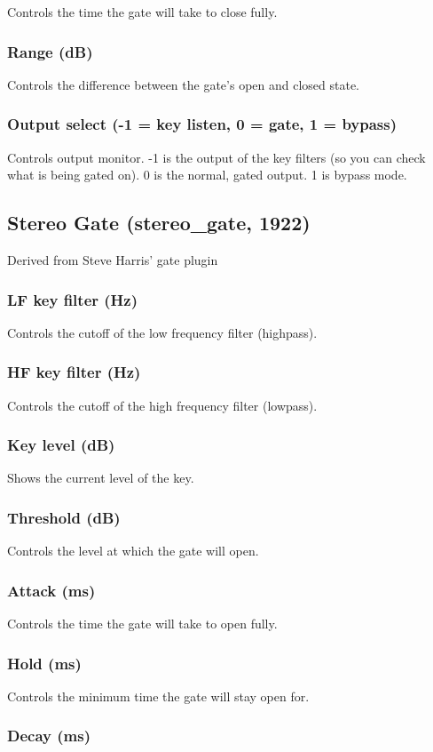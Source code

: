\documentclass[11pt]{article}
\begin{document}
Controls the time the gate will take to close fully.\subsubsection*{Range (dB)}
Controls the difference between the gate's open and closed state.\subsubsection*{Output select (-1 = key listen, 0 = gate, 1 = bypass)}
Controls output monitor. -1 is the output of the key filters (so you can check what is being gated on). 0 is the normal, gated output. 1 is bypass mode.\subsection{Stereo Gate (stereo\_gate, 1922)\label{stereo_gate}\label{id1922}}
Derived from Steve Harris' gate plugin\subsubsection*{LF key filter (Hz)}
Controls the cutoff of the low frequency filter (highpass).\subsubsection*{HF key filter (Hz)}
Controls the cutoff of the high frequency filter (lowpass).\subsubsection*{Key level (dB)}
Shows the current level of the key.\subsubsection*{Threshold (dB)}
Controls the level at which the gate will open.\subsubsection*{Attack (ms)}
Controls the time the gate will take to open fully.\subsubsection*{Hold (ms)}
Controls the minimum time the gate will stay open for.\subsubsection*{Decay (ms)}
\end{document}
